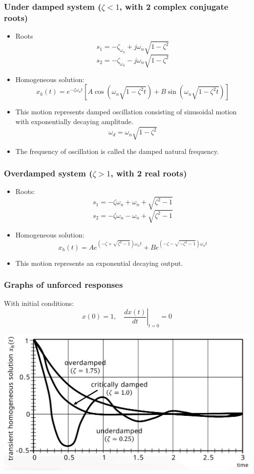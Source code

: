 \documentclass[11pt]{article}
\begin{document}
\subsubsection{Under damped system (\(\zeta < 1\), with 2 complex conjugate roots)}
\label{sec:org77f3311}
\begin{itemize}
\item Roots
\[s_1 = - \zeta_{\omega_n} + j \omega_n \sqrt{1 - \zeta^2}\]
\[s_2 = - \zeta_{\omega_n} - j \omega_n \sqrt{1 - \zeta^2}\]
\item Homogeneous solution:
\[x_h(t) = e^{-\zeta \omega_n t} \left[A \cos \left(\omega_n \sqrt{1 - \zeta^2 t} \right) + B \sin \left(\omega_n \sqrt{1 - \zeta^2 t} \right) \right]\]
\item This motion represents damped oscillation consisting of sinusoidal motion with exponentially decaying amplitude.
\[\omega_d = \omega_n \sqrt{1 - \zeta^2}\]
\item The frequency of oscillation is called the damped natural frequency.
\end{itemize}
\subsubsection{Overdamped system (\(\zeta > 1\), with 2 real roots)}
\label{sec:orgfa81578}
\begin{itemize}
\item Roots:
\[s_1 = -\zeta \omega_n + \omega_n + \sqrt{\zeta^2 - 1}\]
\[s_2 = -\zeta \omega_n - \omega_n + \sqrt{\zeta^2 - 1}\]
\item Homogeneous solution:
\[x_h (t) = Ae^{\left(- \zeta + \sqrt{\zeta^2 - 1} \right) \omega_n t} + Be^{\left( -\zeta - \sqrt{- \zeta^2 - 1} \right) \omega_n t}\]
\item This motion represents an exponential decaying output.
\end{itemize}

 \newpage
\subsubsection{Graphs of unforced responses}
\label{sec:org1004c4c}
With initial conditions:
\[x(0) = 1, \quad \left. \frac{dx (t)}{dt} \right|_{t = 0} = 0\]

\begin{center}
\includegraphics[width=.9\linewidth]{./images/graph-of-unforced-responses.png}
\end{center}
\end{document}
